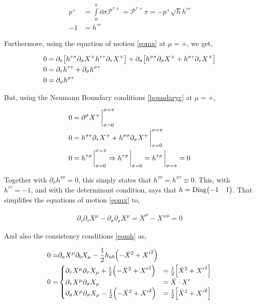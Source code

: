 \begin{align*}
    p^+&=\int\limits_0^\pi\dd{\sigma}\mathcal P^{\tau+}=\mathcal P^{\tau+}\pi=-p^+\sqrt h h^{\tau\tau}\\
    -1&=h^{\tau\tau}
\end{align*}

Furthermore, using the equation of motion \ref{eomx} at $\mu=+$, we get,

\begin{align*}
    0&=\partial_\tau\qty[h^{\tau\sigma}\partial_\sigma X^+h^{\tau\tau}\partial_\tau X^+]+\partial_\sigma\qty[h^{\sigma\sigma}\partial_\sigma X^++h^{\sigma\tau}\partial_\tau X^+]\\
    0&=\partial_\tau h^{\tau\tau}+\partial_\sigma h^{\sigma\tau}\\
    0&=\partial_\sigma h^{\sigma\tau}
\end{align*}

But, using the Neumann Boundary conditions \ref{boundaryc} at $\mu=+$,

\begin{align*}
    0&=\partial^\sigma X^+\eval_{\sigma=0}^{\sigma=\pi}\\
    0&=h^{\sigma\tau}\partial_\tau X^++h^{\sigma\sigma}\partial_\sigma X^+\eval_{\sigma=0}^{\sigma=\pi}\\
    0&=h^{\tau\sigma}\eval_{\sigma=0}^{\sigma=\pi}\Rightarrow h^{\tau\sigma}\eval_{\sigma=0}=h^{\tau\sigma}\eval_{\sigma=\pi}=0
\end{align*}

Together with $\partial_\sigma h^{\tau\sigma}=0$, this simply states that $h^{\tau\sigma}=h^{\sigma\tau}\equiv0$. This, with $h^{\tau\tau}=-1$, 
and with the determinant condition, says that $h=\textnormal{Diag}\mqty(-1&1)$. That simplifies the equations of motion \ref{eomx} to,

\begin{align*}
    \partial_\tau\partial_\tau X^\mu-\partial_\sigma\partial_\sigma X^\mu={\ddot X}^\mu-{X''}^\mu=0
\end{align*}

And also the consistency conditions \ref{eomh} as,

\begin{align*}
    0=&\partial_a X^\mu \partial_b X_\mu-\frac12 h_{ab}\qty(-{\dot X}^2+{X'}^2)\\
    0=&\begin{cases}
        \partial_\tau X^\mu \partial_\tau X_\mu+\frac12\qty(-{\dot X}^2+{X'}^2)&=\frac12\qty[{\dot X}^2+{X'}^2]\\
        \partial_\tau X^\mu \partial_\sigma X_\mu&=\dot X\cdot X'\\
        \partial_\sigma X^\mu \partial_\sigma X_\mu-\frac12\qty(-{\dot X}^2+{X'}^2)&=\frac12\qty[{\dot X}^2+{X'}^2]
    \end{cases}
\end{align*}

